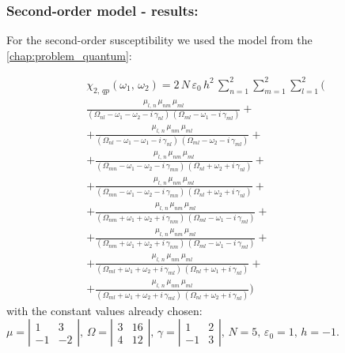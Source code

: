 \documentclass[12pt,twoside,a4paper]{article}
\numberwithin{equation}{subsection}
\numberwithin{figure}{subsection}
\begin{document}
\subsubsection*{Second-order model - results:}

For the second-order susceptibility we used the model from the \ref{chap:problem_quantum}:

\begin{multline} \label{eq:nclin_chipp2}
  \chi_{2, \,qp}({\omega_{1}}, \,{\omega_{2}})
  = 2\,N\,\varepsilon_{0}\,h^{2}\,\sum_{n=1}^{2}\sum_{m=1}^{2}\sum_{l=1}^{2} 
   (
 \\    \frac{{\mu_{l,\,n}}\,{\mu_{nm}}\,{\mu_{ml}}}
      {({\Omega_{nl}} - \omega_1 - \omega_2 - i\,{\gamma_{nl}})\,({\Omega_{ml}} - \omega_1 - i\,{\gamma_{ml}})} 
+ \\ + \frac{{\mu_{l, \,n}}\,{\mu_{nm}}\,{\mu_{ml}}}
      {({\Omega_{nl}} - \omega_1 - \omega_1 - i\,{\gamma_{nl}})\,({\Omega_{ml}} - \omega_2 - i\,{\gamma_{ml}})}
+ \\ + \frac{{\mu_{l, \,n}}\,{\mu_{nm}}\,{\mu_{ml}}}
      {({\Omega_{mn}} - \omega_1 - \omega_2 - i\,{\gamma_{mn}})\,({\Omega_{nl}} + \omega_2 + i\,{\gamma_{nl}})}
+ \\ + \frac{{\mu_{l, \,n }}\,{\mu_{nm}}\,{\mu_{ml}}} 
      {({\Omega_{mn}} - \omega_1 - \omega_2 - i\,{\gamma_{mn}})\,({\Omega_{nl}} + \omega_2 + i\,{\gamma_{nl}})} 
+ \\ + \frac{{\mu_{l, \,n}}\,{\mu_{nm}}\,{\mu_{ml}}}
      {({\Omega_{nm}} + \omega_1 + \omega_2 + i\,{\gamma_{nm}})\,({\Omega_{ml}} - \omega_1 - i\,{\gamma_{ml}})}
+ \\ + \frac{{\mu_{l, \,n}}\,{\mu_{ nm}}\,{\mu_{ml}}}
      {({\Omega_{nm}} + \omega_1 + \omega_2 + i\,{\gamma_{nm}})\,({\Omega_{ml}} - \omega_1 - i\,{\gamma_{ml}})} 
+ \\ + \frac{{\mu_{l, \,n}}\,{\mu_{nm}}\,{\mu_{ml}}}
      {({\Omega_{ml}} + \omega_1 + \omega_2 + i\,{\gamma_{ml}})\,({\Omega_{nl}} + \omega_1 + i\,{\gamma_{nl}})}
+ \\ + \frac{{\mu_{l, \,n}}\,{\mu_{nm}}\,{\mu_{ml}}}
      {({\Omega_{ml}} + \omega_1 + \omega_2 + i\,{\gamma_{ml}})\,({\Omega_{nl}} + \omega_2 + i\,{\gamma_{nl}})}
   )
\end{multline}
with the constant values already chosen: \\
$\mu = \left| \begin{array}{cc} 
    1 & 3 \\ -1 & -2 
  \end{array} \right|,\, 
  \Omega = \left| \begin{array}{cc} 
    3 & 16 \\ 4 & 12 
  \end{array} \right|,\,
  \gamma = \left| \begin{array}{cc} 
  1 & 2 \\ -1 & 3
  \end{array} \right|,\, N=5,\, {\varepsilon_{0}}=1,\,h= - 1.$
\end{document}
